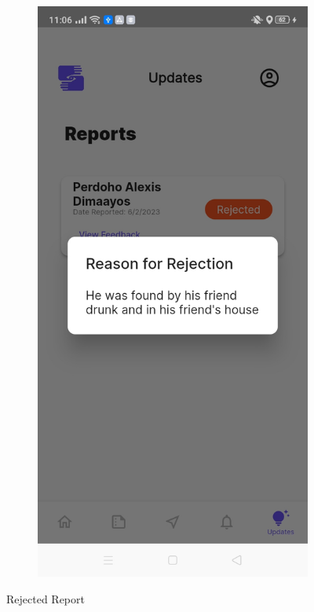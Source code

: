 \begin{figure}[!h]
\begin{subfigure}[c]{0.40\linewidth}
    \end{subfigure}
    \centering
    \begin{subfigure}[c]{0.40\linewidth}
        \centering
        \includegraphics[scale=0.15]{figures/Chapter4/Main/Report-3-1.jpg}
    \end{subfigure}
    \caption{Rejected Report}
    \label{fig:removeNotification}
\end{figure}

